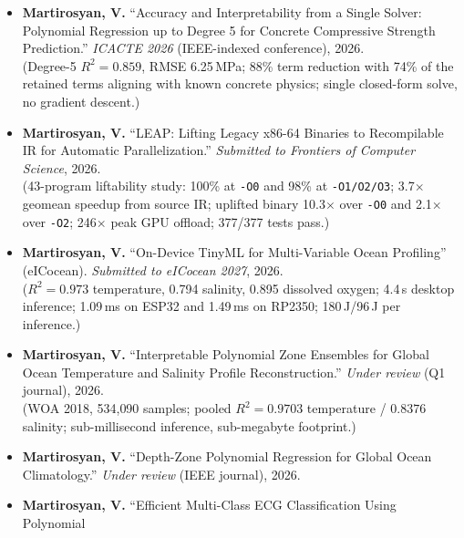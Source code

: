 \documentclass[a4paper,12pt]{article}
\newcommand{\pubgroup}[1]{%
  \vspace{10pt}%
  \noindent{\normalsize\bfseries\color{primary}#1}\par\vspace{-4pt}%
  \noindent{\color{primary}\rule{\linewidth}{0.5pt}}\par\vspace{3pt}%
}
\begin{document}
\pubgroup{Published}
\begin{itemize}[leftmargin=*, itemsep=4pt, topsep=3pt]
  \item \textbf{Martirosyan, V.} ``Accuracy and Interpretability from a Single Solver: Polynomial
        Regression up to Degree 5 for Concrete Compressive Strength Prediction.''
        \textit{ICACTE 2026} (IEEE-indexed conference), 2026.\\
        {\small(Degree-5 $R^2 = 0.859$, RMSE 6.25\,MPa; 88\% term reduction with 74\% of the retained
        terms aligning with known concrete physics; single closed-form solve, no gradient descent.)}
\end{itemize}

\pubgroup{Under Review / Submitted}
\begin{itemize}[leftmargin=*, itemsep=4pt, topsep=3pt]
  \item \textbf{Martirosyan, V.} ``LEAP: Lifting Legacy x86-64 Binaries to Recompilable IR for
        Automatic Parallelization.'' \textit{Submitted to Frontiers of Computer Science}, 2026.\\
        {\small(43-program liftability study: 100\% at \texttt{-O0} and 98\% at \texttt{-O1/O2/O3};
        3.7$\times$ geomean speedup from source IR; uplifted binary 10.3$\times$ over \texttt{-O0}
        and 2.1$\times$ over \texttt{-O2}; 246$\times$ peak GPU offload; 377/377 tests pass.)}
  \item \textbf{Martirosyan, V.} ``On-Device TinyML for Multi-Variable Ocean Profiling''
        (eICocean). \textit{Submitted to eICocean 2027}, 2026.\\
        {\small($R^2 = 0.973$ temperature, 0.794 salinity, 0.895 dissolved oxygen; 4.4\,\textmu s
        desktop inference; 1.09\,ms on ESP32 and 1.49\,ms on RP2350; 180\,\textmu J/96\,\textmu J
        per inference.)}
  \item \textbf{Martirosyan, V.} ``Interpretable Polynomial Zone Ensembles for Global Ocean
        Temperature and Salinity Profile Reconstruction.'' \textit{Under review} (Q1 journal), 2026.\\
        {\small(WOA 2018, 534{,}090 samples; pooled $R^2 = 0.9703$ temperature / $0.8376$ salinity;
        sub-millisecond inference, sub-megabyte footprint.)}
  \item \textbf{Martirosyan, V.} ``Depth-Zone Polynomial Regression for Global Ocean
        Climatology.'' \textit{Under review} (IEEE journal), 2026.
  \item \textbf{Martirosyan, V.} ``Efficient Multi-Class ECG Classification Using Polynomial

\end{itemize}
\end{document}
